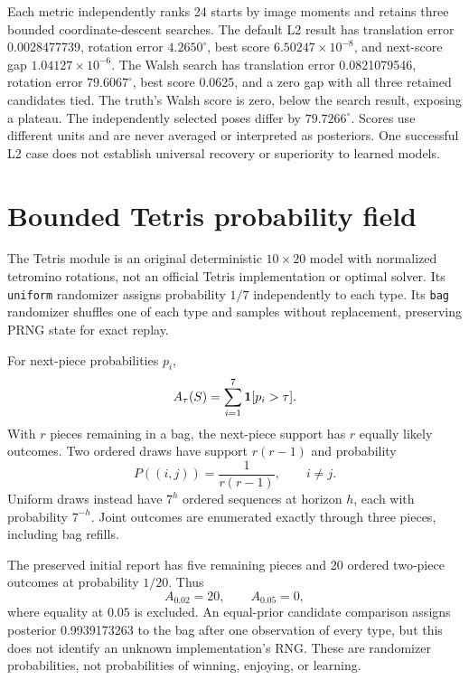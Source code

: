 Each metric independently ranks 24 starts by image moments and retains three bounded coordinate-descent searches. The default L2 result has translation error 0.0028477739, rotation error $4.2650^\circ$, best score $6.50247\times10^{-8}$, and next-score gap $1.04127\times10^{-6}$. The Walsh search has translation error 0.0821079546, rotation error $79.6067^\circ$, best score 0.0625, and a zero gap with all three retained candidates tied. The truth's Walsh score is zero, below the search result, exposing a plateau. The independently selected poses differ by $79.7266^\circ$. Scores use different units and are never averaged or interpreted as posteriors. One successful L2 case does not establish universal recovery or superiority to learned models.

\section{Bounded Tetris probability field}
The Tetris module is an original deterministic $10\times20$ model with normalized tetromino rotations, not an official Tetris implementation or optimal solver. Its \texttt{uniform} randomizer assigns probability $1/7$ independently to each type. Its \texttt{bag} randomizer shuffles one of each type and samples without replacement, preserving PRNG state for exact replay.

For next-piece probabilities $p_i$,
\begin{equation}
A_\tau(S)=\sum_{i=1}^{7}\mathbf 1[p_i>\tau].
\end{equation}
With $r$ pieces remaining in a bag, the next-piece support has $r$ equally likely outcomes. Two ordered draws have support $r(r-1)$ and probability
\begin{equation}
P((i,j))=\frac{1}{r(r-1)},\qquad i\neq j.
\end{equation}
Uniform draws instead have $7^h$ ordered sequences at horizon $h$, each with probability $7^{-h}$. Joint outcomes are enumerated exactly through three pieces, including bag refills.

The preserved initial report has five remaining pieces and 20 ordered two-piece outcomes at probability $1/20$. Thus
\begin{equation}
A_{0.02}=20,\qquad A_{0.05}=0,
\end{equation}
where equality at $0.05$ is excluded. An equal-prior candidate comparison assigns posterior 0.9939173263 to the bag after one observation of every type, but this does not identify an unknown implementation's RNG. These are randomizer probabilities, not probabilities of winning, enjoying, or learning.

